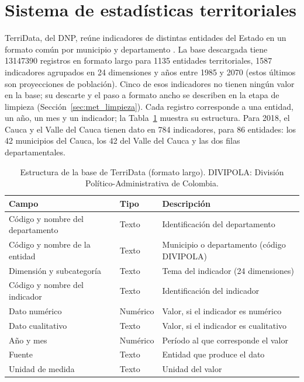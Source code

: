 \section{Sistema de estadísticas territoriales}
\label{sec:datos_terridata}

TerriData, del DNP, reúne indicadores de distintas entidades del Estado en un formato común por municipio y departamento \cite{DNP_TerriData}. La base descargada tiene \num{13147390} registros en formato largo para \num{1135} entidades territoriales, \num{1587} indicadores agrupados en 24 dimensiones y años entre 1985 y 2070 (estos últimos son proyecciones de población). Cinco de esos indicadores no tienen ningún valor en la base; su descarte y el paso a formato ancho se describen en la etapa de limpieza (Sección~\ref{sec:met_limpieza}). Cada registro corresponde a una entidad, un año, un mes y un indicador; la Tabla~\ref{tab:tab-variables-originales-terridata} muestra su estructura. Para 2018, el Cauca y el Valle del Cauca tienen dato en 784 indicadores, para 86 entidades: los 42 municipios del Cauca, los 42 del Valle del Cauca y las dos filas departamentales.

\begin{table}[!htbp]
\centering
\small
\caption[Estructura de la base de TerriData]{Estructura de la base de TerriData (formato largo). DIVIPOLA: División Político-Administrativa de Colombia.}
\label{tab:tab-variables-originales-terridata}
\renewcommand{\arraystretch}{1.1}
\begin{tabularx}{\linewidth}{l l >{\raggedright\arraybackslash}X}
\toprule
Campo & Tipo & Descripción \\
\midrule
Código y nombre del departamento & Texto & Identificación del departamento \\
Código y nombre de la entidad & Texto & Municipio o departamento (código DIVIPOLA) \\
Dimensión y subcategoría & Texto & Tema del indicador (24 dimensiones) \\
Código y nombre del indicador & Texto & Identificación del indicador \\
Dato numérico & Numérico & Valor, si el indicador es numérico \\
Dato cualitativo & Texto & Valor, si el indicador es cualitativo \\
Año y mes & Numérico & Período al que corresponde el valor \\
Fuente & Texto & Entidad que produce el dato \\
Unidad de medida & Texto & Unidad del valor \\
\bottomrule
\end{tabularx}
\end{table}

